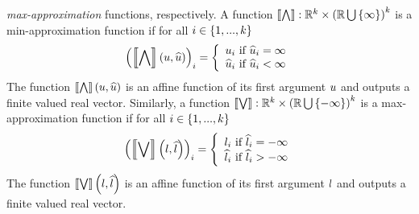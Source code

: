 \emph{max-approximation} functions, respectively.  A function
$\llbracket\bigwedge\rrbracket:\mathbb{R}^k\times\left(\mathbb{R}\bigcup\left\{\infty\right\}\right)^k$ is a
min-approximation function if for all $i\in\left\{1,...,k\right\}$
%
\[
\left(\left\llbracket\bigwedge\right\rrbracket\left(u,\widehat{u}\right)\right)_i=
\left\{
\begin{array}{l}
u_i~\text{if}~\widehat{u}_i=\infty\\
\widehat{u}_i~\text{if}~\widehat{u}_i<\infty
\end{array}
\right.
\]
%
The function $\left\llbracket\bigwedge\right\rrbracket\left(u,\widehat{u}\right)$ is an affine function of its
first argument $u$ and outputs a finite valued real vector.
Similarly, a function
$\llbracket\bigvee\rrbracket:\mathbb{R}^k\times\left(\mathbb{R}\bigcup\left\{-\infty\right\}\right)^k$
is a max-approximation function if for all $i\in\left\{1,...,k\right\}$
%
\[
\left(\left\llbracket\bigvee\right\rrbracket\left(l,\widehat{l}\right)\right)_i=
\left\{
\begin{array}{l}
l_i~\text{if}~\widehat{l}_i=-\infty\\
\widehat{l}_i~\text{if}~\widehat{l}_i>-\infty
\end{array}
\right.
\]
%
The function $\left\llbracket\bigvee\right\rrbracket\left(l,\widehat{l}\right)$ is an affine function of its
first argument $l$ and outputs a finite valued real vector.
%
